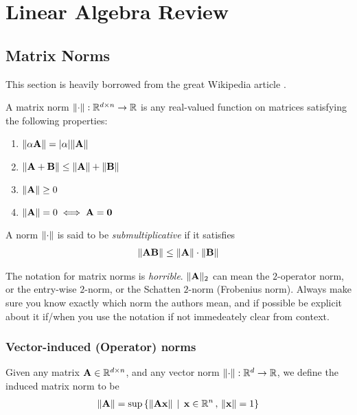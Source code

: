\section{Linear Algebra Review}
\subsection{Matrix Norms}
This section is heavily borrowed from the great Wikipedia article \cite{wiki:Matrix_norm}.
\begin{defn}
A matrix norm $\lVert \cdot \rVert: \mathbb{R}^{d \times n} \to \mathbb{R}$ is any real-valued function on matrices satisfying the following properties:
\begin{enumerate}
    \item $\lVert \alpha \mathbf{A} \rVert = |\alpha| \lVert \mathbf{A} \rVert$
    \item $\lVert \mathbf{A} + {\bf B} \rVert \leq \lVert \mathbf{A} \rVert + \lVert \bf B \rVert$
    \item $\lVert \mathbf{A} \rVert \geq 0$
    \item $\lVert \mathbf{A} \rVert = 0 \iff \mathbf{A} = {\bf 0}$
\end{enumerate}
\end{defn}
\begin{prop}
    A norm $\lVert \cdot \rVert$ is said to be {\em submultiplicative} if it satisfies
    \begin{align*}
        \lVert \mathbf{A} {\bf B} \rVert \leq \lVert \mathbf{A} \rVert \cdot \lVert \bf B \rVert
    \end{align*}
\end{prop}

\begin{remark}
    The notation for matrix norms is {\em horrible}. $\lVert \mathbf{A} \rVert_2$ can mean the $2$-operator norm, or the entry-wise $2$-norm, or the Schatten $2$-norm (Frobenius norm).
    Always make sure you know exactly which norm the authors mean, and if possible be explicit about it if/when you use the notation if not immedeately
    clear from context.
\end{remark}
\subsubsection{Vector-induced (Operator) norms}
Given any matrix $\mathbf{A} \in \mathbb{R}^{d \times n}$, and any vector norm $\lVert \cdot \rVert: \mathbb{R}^d \to \mathbb{R}$, we define
the induced matrix norm to be
\begin{align*}
    \lVert \mathbf{A} \rVert = \sup \, \{ \lVert \mathbf{A} \mathbf{x} \rVert \, \mid \, \mathbf{x} \in \mathbb{R}^n \, , \, \lVert \mathbf{x} \rVert = 1 \}
\end{align*}
